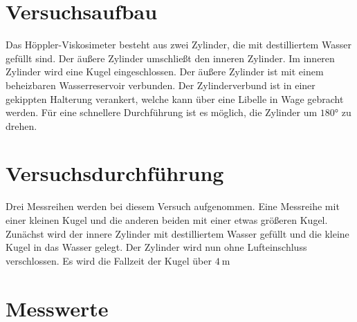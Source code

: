 


\section{Versuchsaufbau}
Das Höppler-Viskosimeter besteht aus zwei Zylinder, die mit destilliertem Wasser gefüllt sind. 
Der äußere Zylinder umschließt den inneren Zylinder. Im inneren Zylinder wird eine Kugel 
eingeschlossen. Der äußere Zylinder ist mit einem beheizbaren Wasserreservoir verbunden. 
Der Zylinderverbund ist in einer gekippten Halterung verankert, welche kann über eine Libelle 
in Wage gebracht werden. Für eine schnellere Durchführung ist es möglich, die Zylinder um 
$\ang{180;;}$ zu drehen.


\section{Versuchsdurchführung}
Drei Messreihen werden bei diesem Versuch aufgenommen. Eine Messreihe mit einer kleinen Kugel 
und die anderen beiden mit einer etwas größeren Kugel. Zunächst wird der innere Zylinder mit  
destilliertem Wasser gefüllt und die kleine Kugel in das Wasser gelegt. Der Zylinder wird nun 
ohne Lufteinschluss verschlossen. Es wird die Fallzeit der Kugel über $\qty{4}{\meter}$




\section{Messwerte}



